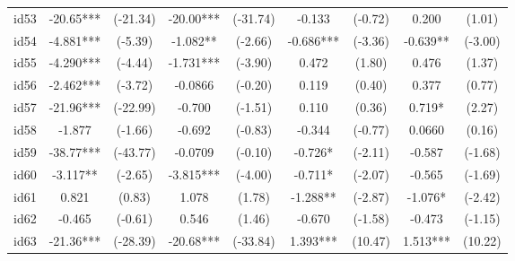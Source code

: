 \documentclass[entropy,article,submit,moreauthors,LaTeX and dvi2pdf]{Definitions/mdpi}
\begin{document}
\begin{center}
\begin{longtable}{ccccccccc}
id53                                          & -20.65***     & (-21.34)      & -20.00***       & (-31.74)         & -0.133            & (-0.72)           & 0.200             & (1.01)            \\
id54                                          & -4.881***     & (-5.39)       & -1.082**        & (-2.66)          & -0.686***         & (-3.36)           & -0.639**          & (-3.00)           \\
id55                                          & -4.290***     & (-4.44)       & -1.731***       & (-3.90)          & 0.472             & (1.80)            & 0.476             & (1.37)            \\
id56                                          & -2.462***     & (-3.72)       & -0.0866         & (-0.20)          & 0.119             & (0.40)            & 0.377             & (0.77)            \\
id57                                          & -21.96***     & (-22.99)      & -0.700          & (-1.51)          & 0.110             & (0.36)            & 0.719*            & (2.27)            \\
id58                                          & -1.877        & (-1.66)       & -0.692          & (-0.83)          & -0.344            & (-0.77)           & 0.0660            & (0.16)            \\
id59                                          & -38.77***     & (-43.77)      & -0.0709         & (-0.10)          & -0.726*           & (-2.11)           & -0.587            & (-1.68)           \\
id60                                          & -3.117**      & (-2.65)       & -3.815***       & (-4.00)          & -0.711*           & (-2.07)           & -0.565            & (-1.69)           \\
id61                                          & 0.821         & (0.83)        & 1.078           & (1.78)           & -1.288**          & (-2.87)           & -1.076*           & (-2.42)           \\
id62                                          & -0.465        & (-0.61)       & 0.546           & (1.46)           & -0.670            & (-1.58)           & -0.473            & (-1.15)           \\
id63                                          & -21.36***     & (-28.39)      & -20.68***       & (-33.84)         & 1.393***          & (10.47)           & 1.513***          & (10.22)           \\

\end{longtable}
\end{center}
\end{document}
